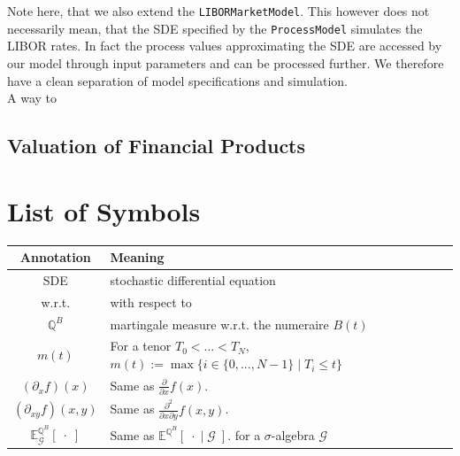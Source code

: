 \documentclass[12pt]{article}
\begin{document}
	Note here, that we also extend the \texttt{LIBORMarketModel}. This however does not necessarily mean, that the SDE specified by the \texttt{ProcessModel} simulates the LIBOR rates. 
	In fact the process values approximating the SDE are accessed by our model through input parameters and can be processed further. We therefore have a clean separation of model specifications and simulation.\\
	A way to 
	
	
	
	
	\subsection{Valuation of Financial Products}
	
	
	
	
	
	
	\pagebreak
	\section{List of Symbols}
	\begin{tabular}{cl}
		
		Annotation & Meaning \\
		\hline
		SDE & stochastic differential equation \\
		w.r.t. & with respect to \\
		$\mathbb{Q}^B$ & martingale measure w.r.t. the numeraire $B(t)$\\
		$m(t)$ & For a tenor $T_0 < ... < T_N$, $m(t):= \max\{i \in \{0, ..., N-1\} \; | \; T_i \le t \}$\\
		$(\partial_{x}f)(x)$ & Same as $\frac{\partial}{\partial x}f(x)$.\\
		$(\partial_{x y}f)(x, y)$ & Same as $\frac{\partial^2}{\partial x \partial y}f(x, y)$.\\
		$\mathbb{E}^{\mathbb{Q}^B}_{\mathcal{G}}\left[ \; \cdot \; \right]$ & Same as
		$\mathbb{E}^{\mathbb{Q}^B}\left[ \; \cdot \; | \; \mathcal{G} \; \right].$ for a $\sigma$-algebra $\mathcal{G}$\\
		
	\end{tabular}
	\pagebreak
		
		
		
		
		
\end{document}
